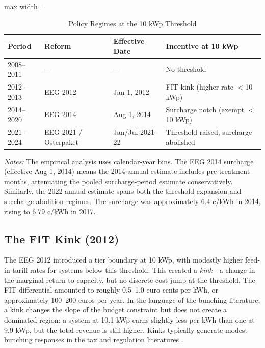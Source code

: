\documentclass[12pt]{article}
\begin{document}
\begin{table}[t]
\centering
\caption{Policy Regimes at the 10 kWp Threshold}
\label{tab:regimes}
\begin{adjustbox}{max width=\textwidth}
\begin{tabular}{llll}
\toprule
Period & Reform & Effective Date & Incentive at 10 kWp \\
\midrule
2008--2011 & --- & --- & No threshold \\
2012--2013 & EEG 2012 & Jan 1, 2012 & FIT kink (higher rate $<$10 kWp) \\
2014--2020 & EEG 2014 & Aug 1, 2014 & Surcharge notch (exempt $<$10 kWp) \\
2021--2024 & EEG 2021 / Osterpaket & Jan/Jul 2021--22 & Threshold raised, surcharge abolished \\
\bottomrule
\end{tabular}
\end{adjustbox}

\vspace{0.5em}
\begin{flushleft}\small \textit{Notes:} The empirical analysis uses calendar-year bins. The EEG 2014 surcharge (effective Aug 1, 2014) means the 2014 annual estimate includes pre-treatment months, attenuating the pooled surcharge-period estimate conservatively. Similarly, the 2022 annual estimate spans both the threshold-expansion and surcharge-abolition regimes. The surcharge was approximately 6.4 c/kWh in 2014, rising to 6.79 c/kWh in 2017.\end{flushleft}
\end{table}

\subsection{The FIT Kink (2012)}

The EEG 2012 introduced a tier boundary at 10 kWp, with modestly higher feed-in tariff rates for systems below this threshold. This created a \textit{kink}---a change in the marginal return to capacity, but no discrete cost jump at the threshold. The FIT differential amounted to roughly 0.5--1.0 euro cents per kWh, or approximately 100--200 euros per year. In the language of the bunching literature, a kink changes the slope of the budget constraint but does not create a dominated region: a system at 10.1 kWp earns slightly less per kWh than one at 9.9 kWp, but the total revenue is still higher. Kinks typically generate modest bunching responses in the tax and regulation literatures \citep{saez2010taxpayers, kleven2016bunching}.
\end{document}
